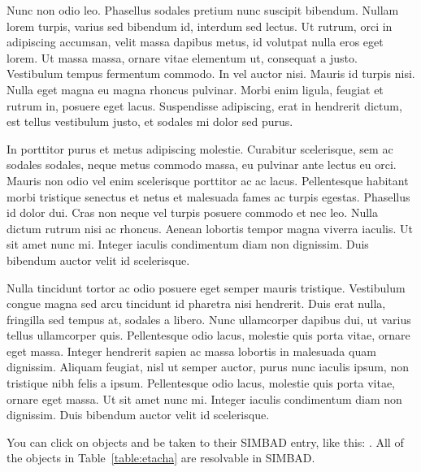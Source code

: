 Nunc non odio leo. Phasellus sodales pretium nunc suscipit bibendum. Nullam lorem turpis, varius sed bibendum id, interdum sed lectus. Ut rutrum, orci in adipiscing accumsan, velit massa dapibus metus, id volutpat nulla eros eget lorem. Ut massa massa, ornare vitae elementum ut, consequat a justo. Vestibulum tempus fermentum commodo. In vel auctor nisi. Mauris id turpis nisi. Nulla eget magna eu magna rhoncus pulvinar. Morbi enim ligula, feugiat et rutrum in, posuere eget lacus. Suspendisse adipiscing, erat in hendrerit dictum, est tellus vestibulum justo, et sodales mi dolor sed purus.

In porttitor purus et metus adipiscing molestie. Curabitur scelerisque, sem ac sodales sodales, neque metus commodo massa, eu pulvinar ante lectus eu orci. Mauris non odio vel enim scelerisque porttitor ac ac lacus. Pellentesque habitant morbi tristique senectus et netus et malesuada fames ac turpis egestas. Phasellus id dolor dui. Cras non neque vel turpis posuere commodo et nec leo. Nulla dictum rutrum nisi ac rhoncus. Aenean lobortis tempor magna viverra iaculis. Ut sit amet nunc mi. Integer iaculis condimentum diam non dignissim. Duis bibendum auctor velit id scelerisque.

Nulla tincidunt tortor ac odio posuere eget semper mauris tristique. Vestibulum congue magna sed arcu tincidunt id pharetra nisi hendrerit. Duis erat nulla, fringilla sed tempus at, sodales a libero. Nunc ullamcorper dapibus dui, ut varius tellus ullamcorper quis. Pellentesque odio lacus, molestie quis porta vitae, ornare eget massa. Integer hendrerit sapien ac massa lobortis in malesuada quam dignissim. Aliquam feugiat, nisl ut semper auctor, purus nunc iaculis ipsum, non tristique nibh felis a ipsum. Pellentesque odio lacus, molestie quis porta vitae, ornare eget massa. Ut sit amet nunc mi. Integer iaculis condimentum diam non dignissim. Duis bibendum auctor velit id scelerisque.

You can click on objects and be taken to their SIMBAD entry, like this: . All of the objects in Table~\ref{table:etacha} are resolvable in SIMBAD.


